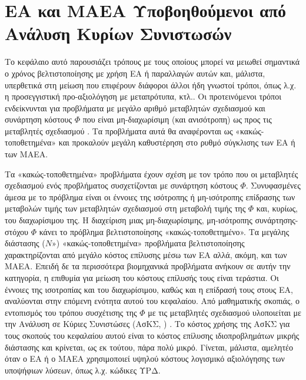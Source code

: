 \ifpdf
    \graphicspath{{4/figures/PNG/}{4/figures/PDF/}{3/figures/}}
\else
    \graphicspath{{4/figures/EPS/}{4/figures/}}
\fi

\chapter{ΕΑ και ΜΑΕΑ Υποβοηθούμενοι από Ανάλυση Κυρίων Συνιστωσών } %
\label{VarCorrChapter}
Το κεφάλαιο αυτό παρουσιάζει τρόπους με τους οποίους μπορεί να μειωθεί σημαντικά ο χρόνος βελτιστοποίησης με χρήση ΕΑ ή  παραλλαγών αυτών και, μάλιστα, υπερθετικά στη μείωση που επιφέρουν διάφοροι άλλοι ήδη γνωστοί τρόποι, όπως λ.χ. η προσεγγιστική προ-αξιολόγηση με μεταπρότυπα, κτλ.. Οι προτεινόμενοι τρόποι ενδείκνυνται για προβλήματα με μεγάλο αριθμό μεταβλητών σχεδιασμού και συνάρτηση κόστους $\Phi$ που είναι μη-διαχωρίσιμη (και ανισότροπη) ως προς τις μεταβλητές σχεδιασμού \cite{Salomon,Roy_2002a,Ghisu_2010}. Τα προβλήματα αυτά θα αναφέρονται ως «κακώς-τοποθετημένα» και προκαλούν μεγάλη καθυστέρηση στο ρυθμό σύγκλισης των ΕΑ ή των ΜΑΕΑ.  

Τα «κακώς-τοποθετημένα» προβλήματα έχουν σχέση με τον τρόπο που οι μεταβλητές σχεδιασμού ενός προβλήματος συσχετίζονται με συνάρτηση κόστους $\Phi$. Συνυφασμένες άμεσα με το πρόβλημα είναι οι έννοιες της ισότροπης ή μη-ισότροπης επίδρασης των μεταβολών τιμής των μεταβλητών σχεδιασμού στη μεταβολή τιμής της $\Phi$ και, κυρίως, του διαχωρίσιμου της. Η διαχείριση μιας μη-διαχωρίσιμης, μη-ισότροπης συνάρτησης-στόχου $\Phi$ κάνει το πρόβλημα βελτιστοποίησης «κακώς-τοποθετημένο». Τα μεγάλης διάστασης ($N»$) «κακώς-τοποθετημένα» προβλήματα βελτιστοποίησης χαρακτηρίζονται από μεγάλο κόστος επίλυσης μέσω των ΕΑ αλλά, ακόμη, και των ΜΑΕΑ. Επειδή δε τα περισσότερα βιομηχανικά προβλήματα ανήκουν σε αυτήν την κατηγορία, η επιθυμία για μείωση του κόστους επίλυσής τους είναι τεράστια.  Οι έννοιες της ισοτροπίας και του διαχωρίσιμου, καθώς και η επίδρασή τους στους ΕΑ, αναλύονται στην επόμενη ενότητα αυτού του κεφαλαίου. Από μαθηματικής σκοπιάς, ο εντοπισμός του τρόπου συσχέτισης της $\Phi$ με τις μεταβλητές σχεδιασμού υλοποιείται με την Ανάλυση σε Κύριες Συνιστώσες (ΑσΚΣ, ) \cite{Haykin}. Το κόστος χρήσης της ΑσΚΣ για τους σκοπούς του κεφαλαίου αυτού είναι το κόστος επίλυσης ιδιοπροβλημάτων μικρής διάστασης και κρίνεται, ως εκ τούτου, πάρα πολύ μικρό. Γίνεται, μάλιστα, αμελητέο όταν ο ΕΑ ή ο ΜΑΕΑ χρησιμοποιεί υψηλού κόστους λογισμικό αξιολόγησης των υποψήφιων λύσεων, όπως λ.χ. κώδικες ΥΡΔ.

